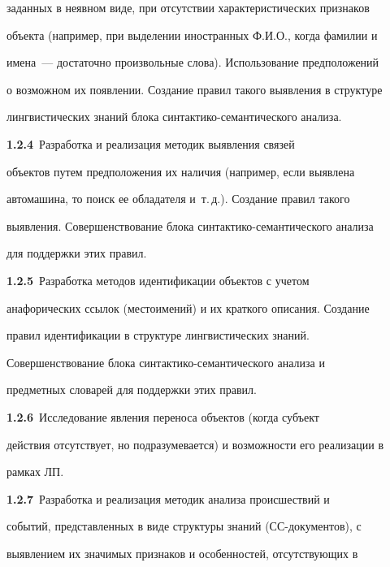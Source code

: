 заданных в неявном виде, при отсутствии характеристических признаков 


объекта (например, при  выделении  иностранных Ф.И.О., когда фамилии и 


имена~--- достаточно произвольные слова). Использование предположений 


о возможном их появлении. Создание правил такого выявления в структуре 


лингвистических знаний блока син\-так\-ти\-ко-семантического анализа.   


   


   \textbf{1.2.4}\ Разработка и реализация методик выявления связей 


объектов путем предположения их наличия (например, если выявлена 


автомашина, то поиск ее обладателя и~т.\,д.).  Создание правил такого 


выявления. Совершенствование блока синтактико-семантического анализа 


для поддержки этих правил.   


   


   \textbf{1.2.5}\ Разработка методов идентификации объектов с учетом 


анафорических ссылок (местоимений) и их краткого описания. Создание 


правил идентификации в структуре лингвистических знаний. 


   


   Совершенствование блока синтактико-семантического анализа и 


предметных словарей для поддержки этих правил.  


   


   \textbf{1.2.6}\ Исследование явления переноса объектов (когда субъект 


действия отсутствует, но подразумевается) и возможности его реализации в 


рамках ЛП.  


   


   \textbf{1.2.7}\ Разработка и реализация методик анализа происшествий и 


событий, представленных в виде структуры знаний (СС-документов), с 


выявлением их значимых признаков и особенностей, отсутствующих в 


